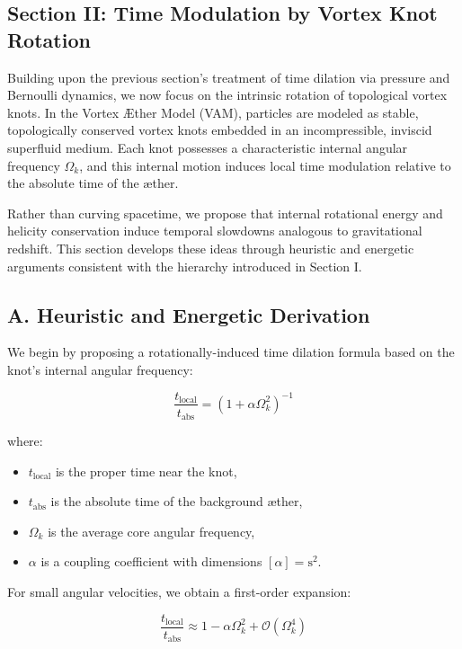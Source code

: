 \subsection*{Section II: Time Modulation by Vortex Knot Rotation}

Building upon the previous section's treatment of time dilation via pressure and Bernoulli dynamics, we now focus on the intrinsic rotation of topological vortex knots. In the Vortex Æther Model (VAM), particles are modeled as stable, topologically conserved vortex knots embedded in an incompressible, inviscid superfluid medium. Each knot possesses a characteristic internal angular frequency $\Omega_k$, and this internal motion induces local time modulation relative to the absolute time of the æther.

Rather than curving spacetime, we propose that internal rotational energy and helicity conservation induce temporal slowdowns analogous to gravitational redshift. This section develops these ideas through heuristic and energetic arguments consistent with the hierarchy introduced in Section I.

\subsection*{A. Heuristic and Energetic Derivation}

We begin by proposing a rotationally-induced time dilation formula based on the knot's internal angular frequency:

\begin{equation}
\frac{t_{\text{local}}}{t_{\text{abs}}} = \left(1 + \alpha \Omega_k^2 \right)^{-1}
\end{equation}

where:

\begin{itemize}
\item $t_{\text{local}}$ is the proper time near the knot,
\item $t_{\text{abs}}$ is the absolute time of the background æther,
\item $\Omega_k$ is the average core angular frequency,
\item $\alpha$ is a coupling coefficient with dimensions $[\alpha] = \text{s}^2$.
\end{itemize}

For small angular velocities, we obtain a first-order expansion:

\begin{equation}
\frac{t_{\text{local}}}{t_{\text{abs}}} \approx 1 - \alpha \Omega_k^2 + \mathcal{O}(\Omega_k^4)
\end{equation}

